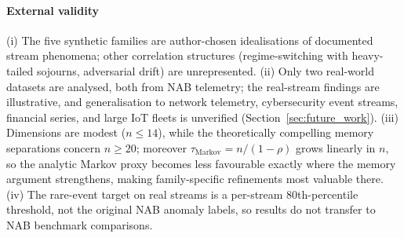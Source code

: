 \documentclass[sensors,article,submit,pdftex,moreauthors]{Definitions/mdpi}
\providecommand{\DIFadd}[1]{{\protect\color{blue}#1}} %
\providecommand{\DIFdel}[1]{} %
\providecommand{\DIFaddbegin}{} %
\providecommand{\DIFaddend}{} %
\providecommand{\DIFdelbegin}{} %
\providecommand{\DIFdelend}{} %
\begin{document}
\paragraph{\DIFadd{External validity}} \DIFadd{(i) The five synthetic families are author-chosen idealisations of documented stream phenomena; other correlation structures (regime-switching with heavy-tailed sojourns, adversarial drift) are unrepresented. (ii) Only two real-world datasets are analysed, both from NAB telemetry; the }\DIFaddend real-stream \DIFdelbegin \DIFdel{validation across financial, network-traffic, and additional sensor domains remains future work. }%
\textbf{\DIFdel{Modest dimensions.}} %
\DIFdel{Computation is tractable only to $n \leq 14$; compelling memory gaps are expected at $n \geq 20$ per the polynomial-in-$N$ classical bounds, for which $\Omega(\sqrt{N})$ is our conservative reference }\DIFdelend \DIFaddbegin \DIFadd{findings are illustrative, and generalisation to network telemetry, cybersecurity event streams, financial series, and large IoT fleets is unverified }\DIFaddend (Section~\DIFdelbegin \DIFdel{\ref{sec:heuristic_model}). The }\DIFdelend \DIFaddbegin \DIFadd{\ref{sec:future_work}). (iii) Dimensions are modest ($n \leq 14$), while the theoretically compelling memory separations concern $n \geq 20$; moreover $\tau_{\text{Markov}} = n/(1-\rho)$ grows linearly in $n$, so the analytic }\DIFaddend Markov proxy becomes less favourable \DIFdelbegin \DIFdel{at higher $n$ because $\tau_{\text{Markov}} = n/(1-\rho)$ grows linearly}\DIFdelend \DIFaddbegin \DIFadd{exactly where the memory argument strengthens}\DIFaddend , making family-specific refinements \DIFdelbegin \DIFdel{especially }\DIFdelend \DIFaddbegin \DIFadd{most }\DIFaddend valuable there. \DIFdelbegin %
\textbf{\DIFdel{Task-specific lower bounds.}} %
\DIFdel{The $\Omega(\sqrt{N})$ floor is representative, not universal; exact hardness results in the originating framework are task-specific.
}%
\DIFdelend \DIFaddbegin \DIFadd{(iv) The rare-event target on real streams is a per-stream 80th-percentile threshold, not the original NAB anomaly labels, so results do not transfer to NAB benchmark comparisons.
}\DIFaddend 
\end{document}

